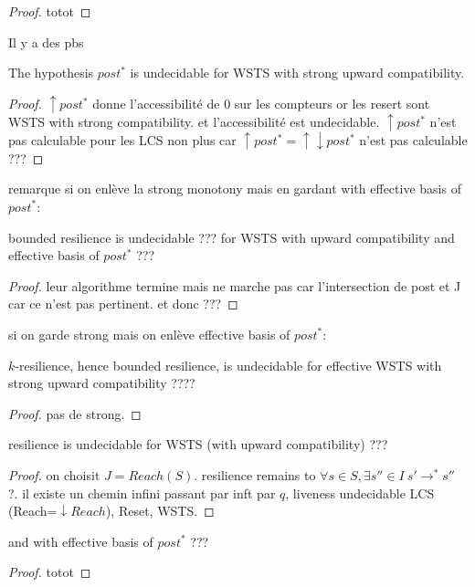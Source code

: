 \begin{proof}
totot
\end{proof}

Il y a des pbs

\begin{proposition}
The hypothesis $post^*$ is undecidable for WSTS with strong upward compatibility.
\end{proposition}


\begin{proof}
$\uparrow post^*$ donne l'accessibilité de 0 sur les compteurs or les resert sont WSTS with strong compatibility. et l'accessibilité est undecidable.
$\uparrow post^*$ n'est pas calculable pour les LCS non plus car $\uparrow post^*= \uparrow \downarrow post^*$ n'est pas calculable ???
\end{proof}

remarque si on enlève la strong monotony mais en gardant with effective basis of $post^*$:


\begin{theorem}
{\sc bounded resilience} is undecidable ??? for WSTS with upward compatibility and effective basis of $post^*$ ???
\end{theorem}

\begin{proof}
leur algorithme termine mais ne marche pas car l'intersection de post et J car ce n'est pas pertinent. et donc ???
\end{proof}

si on garde strong mais on enlève effective basis of $post^*$:

\begin{proposition}
{\sc $k$-resilience}, hence {\sc bounded resilience}, is undecidable for effective WSTS with strong upward compatibility ????
\end{proposition}

\begin{proof}
pas de strong.
\end{proof}

\begin{theorem}
{\sc resilience} is undecidable for WSTS (with upward compatibility) ???
\end{theorem}


\begin{proof}
on choisit $J=Reach(S)$. resilience remains to {$\forall s \in S,  \exists s'' \in I ~ s' \rightarrow^{*} s''$ ?\newline}. il existe un chemin infini passant par inft par $q$, liveness undecidable LCS (Reach=$\downarrow Reach$), Reset, WSTS.
\end{proof}

and with effective basis of $post^*$ ???



\begin{proof}
totot
\end{proof}




